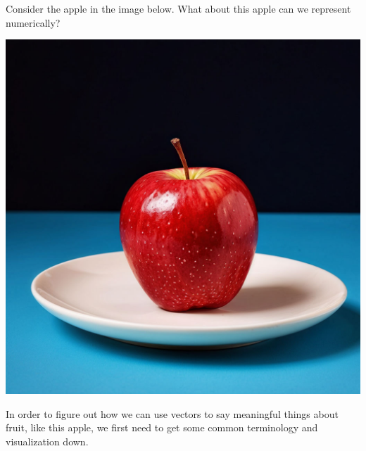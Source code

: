 \documentclass{ximera}
\begin{document}
\begin{exploration}

Consider the apple in the image below. What about this apple can we represent numerically?

\begin{center}
  \includegraphics[width=.5\textwidth]{apple-1.jpeg}
\end{center}

\begin{selectAll}
\end{selectAll}
\end{exploration}

In order to figure out how we can use vectors to say meaningful things about fruit, like this apple, we first need to get some common terminology and visualization down.
\end{document}
